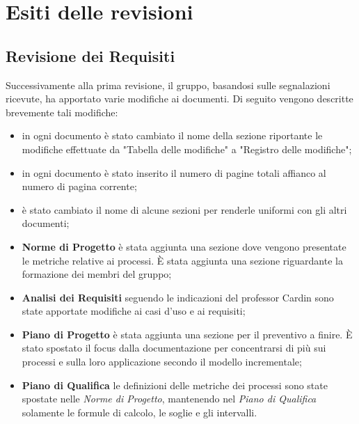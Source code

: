 \section{Esiti delle revisioni}
	\subsection{Revisione dei Requisiti}
	Successivamente alla prima revisione, il gruppo, basandosi sulle 
	segnalazioni ricevute, ha apportato varie modifiche ai documenti. 
	Di seguito vengono descritte brevemente tali modifiche:
	\begin{itemize}
		\item in ogni documento è stato cambiato il nome della sezione 
		riportante le modifiche effettuate da "Tabella delle modifiche" a 
		"Registro delle modifiche";
		\item in ogni documento è stato inserito il numero di pagine totali 
		affianco al numero di pagina corrente;
		\item è stato cambiato il nome di alcune sezioni per renderle uniformi 
		con gli altri documenti;
		\item \textbf{Norme di Progetto} è stata aggiunta una sezione dove 
		vengono presentate le metriche relative ai processi. È stata aggiunta
		 una sezione riguardante la formazione dei membri del gruppo;
		\item \textbf{Analisi dei Requisiti} seguendo le indicazioni del 
		professor Cardin sono state apportate modifiche ai casi d'uso e ai requisiti;
		\item \textbf{Piano di Progetto} è stata aggiunta una sezione per il 
		preventivo a finire. È stato spostato il focus dalla documentazione per concentrarsi di più sui processi e sulla loro applicazione secondo il modello incrementale; %
		\item \textbf{Piano di Qualifica} le definizioni 
		delle metriche dei processi sono state spostate nelle \textit{Norme di Progetto}, mantenendo nel \textit{Piano di Qualifica} solamente le formule di calcolo, le soglie e gli intervalli.
	\end{itemize}
	